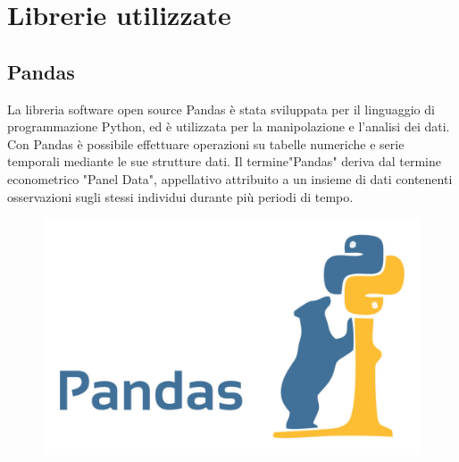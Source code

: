\section{Librerie utilizzate}
\subsection{Pandas}
La libreria software open source Pandas è stata sviluppata per il linguaggio di programmazione Python, ed è utilizzata per la manipolazione e l'analisi dei dati. Con Pandas è possibile effettuare operazioni su tabelle numeriche e serie temporali mediante le sue strutture dati. 
Il termine"Pandas" deriva dal termine econometrico "Panel Data", appellativo attribuito a un insieme di dati contenenti osservazioni sugli stessi individui durante più periodi di tempo.
\begin{figure}
    \begin{center}    
        \includegraphics[width=0.9\linewidth]{images/image4.jpeg}
    \end{center}
\end{figure}

